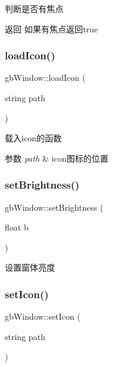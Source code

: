 判断是否有焦点 

\begin{DoxyReturn}{返回}
如果有焦点返回true 
\end{DoxyReturn}
\mbox{\label{classgb_window_a7afc7ded286b296fa5f2a324cbd065ff}} 
\subsubsection{\texorpdfstring{loadIcon()}{loadIcon()}}
{\footnotesize\ttfamily gb\+Window\+::load\+Icon (\begin{DoxyParamCaption}\item[{string}]{path }\end{DoxyParamCaption})\hspace{0.3cm}{\ttfamily [protected]}}



载入icon的函数 


\begin{DoxyParams}{参数}
{\em path} & icon图标的位置 \\
\hline
\end{DoxyParams}
\mbox{\label{classgb_window_aec17f885a0d2dcf1a6d281799542071a}} 
\subsubsection{\texorpdfstring{setBrightness()}{setBrightness()}}
{\footnotesize\ttfamily gb\+Window\+::set\+Brightness (\begin{DoxyParamCaption}\item[{float}]{b }\end{DoxyParamCaption})}



设置窗体亮度 

\mbox{\label{classgb_window_a1a4802fa6b726f60f6dd61c7de2f8d73}} 
\subsubsection{\texorpdfstring{setIcon()}{setIcon()}}
{\footnotesize\ttfamily gb\+Window\+::set\+Icon (\begin{DoxyParamCaption}\item[{string}]{path }\end{DoxyParamCaption})}



